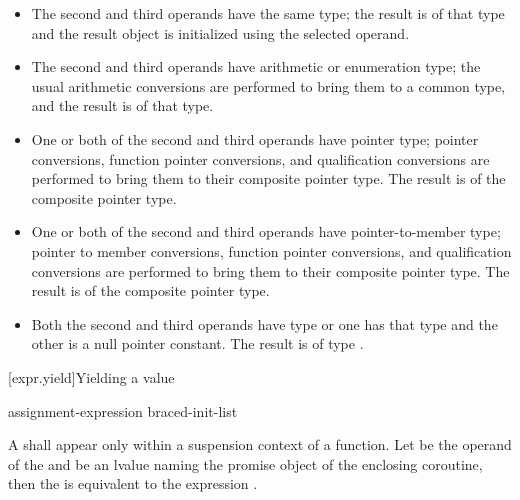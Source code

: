 \begin{itemize}
\item The second and third operands have the same type; the result is of
that type and the result object is initialized using the selected operand.

\item The second and third operands have arithmetic or enumeration type;
the usual arithmetic conversions are performed to bring them to a common
type, and the result is of that type.

\item One or both of the second and third operands have pointer type;
pointer conversions,
function pointer conversions, and
qualification conversions
are performed to bring them to their
composite pointer type. The result is of the composite
pointer type.

\item One or both of the second and third operands have pointer-to-member type;
pointer to member conversions,
function pointer conversions, and
qualification conversions
are performed to bring them to their composite
pointer type. The result is of the composite pointer type.

\item
Both the second and third operands have type  or one has
that type and the other is a null pointer constant. The result is of type
.

\end{itemize}

[expr.yield]{Yielding a value}%
%
%

\begin{bnf}
  \br
   assignment-expression\br
   braced-init-list
\end{bnf}

\pnum
A  shall appear only within a suspension context
of a function.
Let  be the operand of the  and
 be an lvalue naming the promise object of the enclosing
coroutine, then the 
is equivalent to the expression
\tcode{)}.

